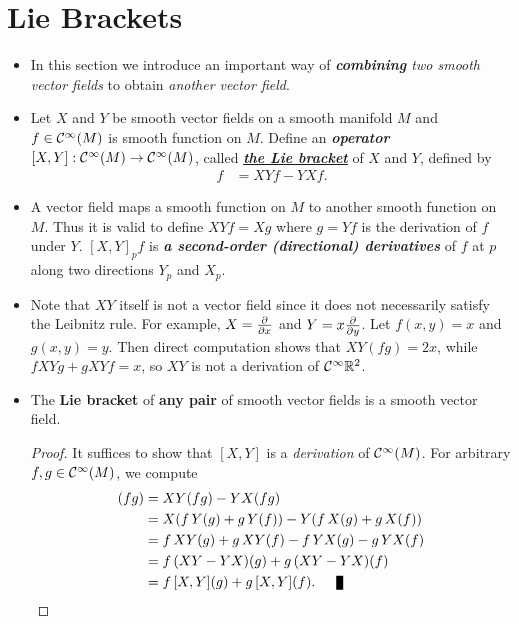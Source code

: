 \documentclass[11pt]{article}
\begin{document}
\section{Lie Brackets}
\begin{itemize}
\item In this section we introduce an important way of \emph{\textbf{combining} two smooth vector fields} to obtain \emph{another vector field}.

\item \begin{definition}
Let $X$ and $Y$ be smooth vector fields on a smooth manifold $M$ and $f \in {\mathcal C}^{\infty}(M)$ is smooth function  on $M$. Define an \emph{\textbf{operator}} $[X,Y] : {\mathcal C}^{\infty}(M) \rightarrow {\mathcal C}^{\infty}(M)$, called \underline{\emph{\textbf{the Lie bracket}}} of $X$ and $Y$, defined by
\begin{align}
[X,Y]\,f &= XYf - YXf. \label{eqn: lie_bracket}
\end{align}
\end{definition}

\item \begin{remark}
A vector field maps a smooth function on $M$ to another smooth function on $M$. Thus it is valid to define $XYf = Xg$ where $g= Yf$ is the derivation of $f$ under $Y$. $[X, Y]_{p}f$ is \emph{\textbf{a second-order (directional) derivatives}} of $f$ at $p$ along two directions $Y_p$ and $X_p$.
\end{remark}

\item \begin{remark}
Note that $XY$ itself is not a vector field since it does not necessarily satisfy the Leibnitz rule. For example, $X = \frac{\partial }{ \partial x}$ and $Y = x \frac{\partial }{ \partial y}$. Let $f(x, y) = x$ and $g(x, y) = y$. Then direct computation shows that $XY(fg) = 2x$, while $f XYg + g XYf  = x$, so $XY$ is not a derivation of ${\mathcal C}^{\infty}{\mathbb R}^2$.
\end{remark}

\item \begin{lemma}
The \textbf{Lie bracket} of \textbf{any pair} of smooth vector fields is a smooth vector field.
\end{lemma}
\begin{proof}
It suffices to show that $[X,Y]$ is a \emph{derivation} of ${\mathcal C}^{\infty}(M)$. For arbitrary $f, g \in {\mathcal C}^{\infty}(M)$, we compute
\begin{align*}
[X,Y](fg) &= XY(fg) - YX(fg) \\
&= X(f\,Y(g) + g\,Y(f)) - Y(f\,X(g) + g\,X(f)) \\
&= f\,XY(g) + g\,XY(f) - f\,YX(g) - g\,YX(f) \\
&= f\,(XY - YX)(g) + g\,(XY - YX)(f)  \\
&= f\,[X, Y](g) + g\,[X, Y](f). \qed
\end{align*}
\end{proof}


\end{itemize}
\end{document}

